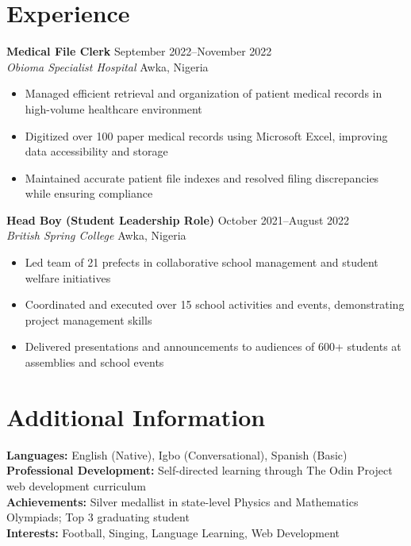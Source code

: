 \documentclass[11pt,a4paper]{article}
\newcommand{\cventry}[6]{
    \textbf{#2} \hfill #1 \\
    \textit{#3} \hfill #4 \\
    #6
    \vspace{8pt}
}
\begin{document}
\section{Experience}

\cventry{September 2022--November 2022}{Medical File Clerk}{Obioma Specialist Hospital}{Awka, Nigeria}{}{
    \begin{itemize}[leftmargin=20pt, noitemsep, topsep=0pt]
        \item Managed efficient retrieval and organization of patient medical records in high-volume healthcare environment
        \item Digitized over 100 paper medical records using Microsoft Excel, improving data accessibility and storage
        \item Maintained accurate patient file indexes and resolved filing discrepancies while ensuring compliance
    \end{itemize}
}

\cventry{October 2021--August 2022}{Head Boy (Student Leadership Role)}{British Spring College}{Awka, Nigeria}{}{
    \begin{itemize}[leftmargin=20pt, noitemsep, topsep=0pt]
        \item Led team of 21 prefects in collaborative school management and student welfare initiatives
        \item Coordinated and executed over 15 school activities and events, demonstrating project management skills
        \item Delivered presentations and announcements to audiences of 600+ students at assemblies and school events
    \end{itemize}
}

\section{Additional Information}

\textbf{Languages:} English (Native), Igbo (Conversational), Spanish (Basic) \\
\textbf{Professional Development:} Self-directed learning through The Odin Project web development curriculum \\
\textbf{Achievements:} Silver medallist in state-level Physics and Mathematics Olympiads; Top 3 graduating student \\
\textbf{Interests:} Football, Singing, Language Learning, Web Development
\end{document}
